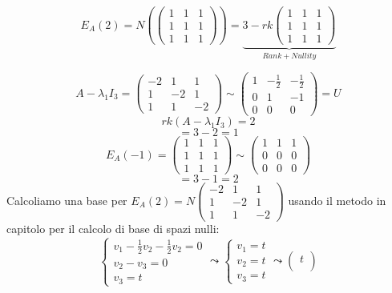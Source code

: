 \documentclass[12pt]{article}
\begin{document}
\begin{enumerate}
\[E_A(2) = N\left(\begin{pmatrix}
    1 & 1 & 1\\
    1 & 1 & 1\\
    1 & 1 & 1
\end{pmatrix}\right) = \underbrace{3 - rk\begin{pmatrix}
    1 & 1 & 1\\
    1 & 1 & 1\\
    1 & 1 & 1
\end{pmatrix}}_{Rank+Nullity}\]

\[A - \lambda_1 I_3 = \begin{pmatrix}
    -2 & 1  & 1\\
    1 & -2 & 1\\
    1 & 1 & -2
\end{pmatrix} \sim \begin{pmatrix}
    1 & -\frac{1}{2} & -\frac{1}{2}\\
    0 & 1 & -1\\
    0 & 0 & 0
\end{pmatrix} = U\]
\[rk(A- \lambda_1 I_3) = 2\]
\[= 3 - 2 = 1\]
\[E_A(-1) = \begin{pmatrix}
    1 & 1 & 1\\
    1 & 1 & 1\\
    1 & 1 & 1
\end{pmatrix} \sim \begin{pmatrix}
    1 & 1 & 1\\
    0 & 0 & 0\\
    0 & 0 & 0
\end{pmatrix}\]
\[= 3 - 1 = 2\]
Calcoliamo una base per $E_A(2) = N\begin{pmatrix}
    -2 & 1 & 1\\
    1 & -2 & 1\\
    1 & 1 & -2
\end{pmatrix}$ usando il metodo in capitolo per il calcolo di base di spazi nulli:
\[\begin{cases}
    v_1 - \frac{1}{2}v_2 - \frac{1}{2}v_2 = 0\\
    v_2 - v_3 = 0\\
    v_3 = t
\end{cases} \leadsto \begin{cases}
    v_1 = t\\
    v_2 = t\\
    v_3 = t
\end{cases} \leadsto \begin{pmatrix}
    t\\

\end{pmatrix}\]
\end{enumerate}
\end{document}
